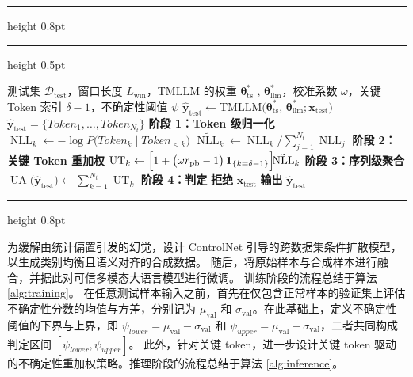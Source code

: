 \vspace{1em}
\hrule height 0.8pt
\vspace{3pt}
\begingroup
\captionsetup{singlelinecheck=false, justification=raggedright, font=normalsize}
\label{alg:inference}
\endgroup
\vspace{3pt}
\hrule height 0.5pt
\vspace{3pt}
\begingroup
\linespread{1.25}\selectfont
\begin{algorithmic}[1]
    \Require 测试集 $\mathcal{D}_\text{test}$，窗口长度 $L_{\mathrm{win}}$，TMLLM 的权重 $\bm{\theta}_\mathrm{ts}^*$ , $\bm{\theta}_\mathrm{llm}^*$，校准系数 $\omega$，关键 Token 索引 $\delta-1$，不确定性阈值 $\psi$
    \State $\hat{\bm{y}}_\mathrm{test} \gets \mathrm{TMLLM}(\bm{\theta}_\mathrm{ts}^*$, $\bm{\theta}_\mathrm{llm}^*;\bm{x}_\mathrm{test})$
    \State $\hat{\bm{y}}_\mathrm{test}=\{\mathit{Token}_1,\dots,\mathit{Token}_{N_t}\}$
    \Statex \textbf{阶段 1：Token 级归一化}
    \State $\operatorname{NLL}_k \gets -\!\log P\!\bigl(\mathit{Token}_k \mid \mathit{Token}_{<k}\bigr)$
    \EndFor
    \State $\displaystyle
    \tilde{\operatorname{NLL}}_k \gets 
    \operatorname{NLL}_k \Big/ \sum_{j=1}^{N_t}\operatorname{NLL}_j$
    \Statex \textbf{阶段 2：关键 Token 重加权}
    \State $\displaystyle
    \operatorname{UT}_k \gets
    \Bigl[1 + \bigl(\omega r_{\mathrm{pb}} - 1\bigr)\,
    \mathbf{1}_{\{k=\delta-1\}}\Bigr]\!
    \tilde{\operatorname{NLL}}_k$
    \EndFor
    \Statex \textbf{阶段 3：序列级聚合}
    \State $\displaystyle
    \operatorname{UA}\!\bigl(\hat{\bm{y}}_\mathrm{test}\bigr) \gets
    \sum_{k=1}^{N_t}\operatorname{UT}_k$
    \Statex \textbf{阶段 4：判定}
    \State \textbf{拒绝} $\bm{x}_\mathrm{test}$ 
    \Else
    \State \textbf{输出} $\hat{\bm{y}}_\mathrm{test}$
    \EndIf
    \EndFor
\end{algorithmic}
\endgroup
\vspace{3pt}
\hrule height 0.8pt
\vspace{1em}


为缓解由统计偏置引发的幻觉，设计 ControlNet 引导的跨数据集条件扩散模型，以生成类别均衡且语义对齐的合成数据。
随后，将原始样本与合成样本进行融合，并据此对可信多模态大语言模型进行微调。
训练阶段的流程总结于算法 \ref{alg:training}。
在任意测试样本输入之前，首先在仅包含正常样本的验证集上评估不确定性分数的均值与方差，分别记为 $\mu_\mathrm{val}$ 和 $\sigma_\mathrm{val}$。在此基础上，定义不确定性阈值的下界与上界，即 $\psi_{lower}=\mu_\mathrm{val} - \sigma_\mathrm{val}$ 和 $\psi_{upper}=\mu_\mathrm{val} + \sigma_\mathrm{val}$，二者共同构成判定区间 $[\psi_{lower}, \psi_{upper}]$。
此外，针对关键 token，进一步设计关键 token 驱动的不确定性重加权策略。推理阶段的流程总结于算法 \ref{alg:inference}。

